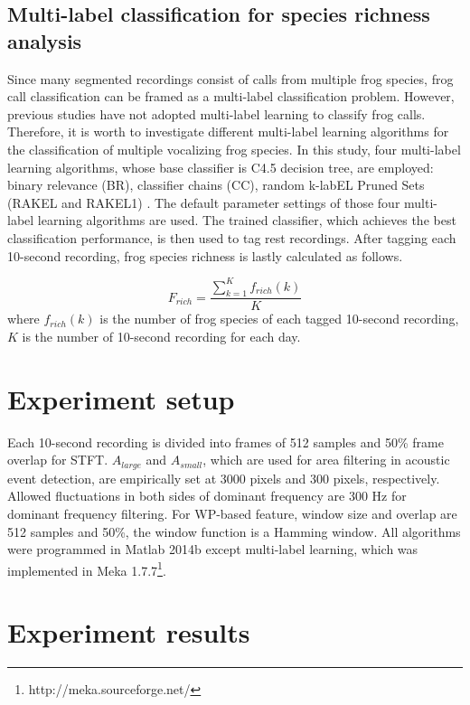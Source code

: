 \subsection{Multi-label classification for species richness analysis} 
Since many segmented recordings consist of calls from multiple frog species, frog call classification can be framed as a multi-label classification problem. However, previous studies have not adopted multi-label learning to classify frog calls. Therefore, it is worth to investigate different multi-label learning algorithms for the classification of multiple vocalizing frog species. In this study, four multi-label learning algorithms, whose base classifier is C4.5 decision tree, are employed: binary relevance (BR), classifier chains (CC), random k-labEL Pruned Sets (RAKEL and RAKEL1) \cite{ZhangReview2014}. The default parameter settings of those four multi-label learning algorithms are used. The trained classifier, which achieves the best classification performance, is then used to tag rest recordings. After tagging each 10-second recording, frog species richness is lastly calculated as follows.

\begin{equation}
F_{rich} = \frac{\sum_{k=1}^{K}f_{rich}(k)}{K}
\end{equation} 
where $f_{rich}(k)$ is the number of frog species of each tagged 10-second recording, $K$ is the number of 10-second recording for each day.


\section{Experiment setup}
Each 10-second recording is divided into frames of 512 samples and 50\% frame overlap for STFT. $A_{large}$ and $A_{small}$, which are used for area filtering in acoustic event detection, are empirically set at 3000 pixels and 300 pixels, respectively. Allowed fluctuations in both sides of dominant frequency are 300 Hz for dominant frequency filtering. For WP-based feature, window size and overlap are 512 samples and 50\%, the window function is a Hamming window. All algorithms were programmed in Matlab 2014b except multi-label learning, which was implemented in Meka 1.7.7\footnote[4]{http://meka.sourceforge.net/}. 

\section{Experiment results}

